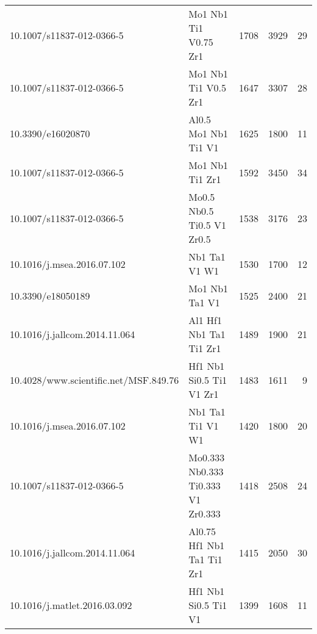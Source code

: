 \begin{tabular}{llrrr}
             10.1007/s11837-012-0366-5 &                        Mo1 Nb1 Ti1 V0.75 Zr1 &                1708 &                 3929 &                        29 \\
             10.1007/s11837-012-0366-5 &                         Mo1 Nb1 Ti1 V0.5 Zr1 &                1647 &                 3307 &                        28 \\
                     10.3390/e16020870 &                         Al0.5 Mo1 Nb1 Ti1 V1 &                1625 &                 1800 &                        11 \\
             10.1007/s11837-012-0366-5 &                              Mo1 Nb1 Ti1 Zr1 &                1592 &                 3450 &                        34 \\
             10.1007/s11837-012-0366-5 &                   Mo0.5 Nb0.5 Ti0.5 V1 Zr0.5 &                1538 &                 3176 &                        23 \\
            10.1016/j.msea.2016.07.102 &                                Nb1 Ta1 V1 W1 &                1530 &                 1700 &                        12 \\
                     10.3390/e18050189 &                               Mo1 Nb1 Ta1 V1 &                1525 &                 2400 &                        21 \\
         10.1016/j.jallcom.2014.11.064 &                      Al1 Hf1 Nb1 Ta1 Ti1 Zr1 &                1489 &                 1900 &                        21 \\
 10.4028/www.scientific.net/MSF.849.76 &                     Hf1 Nb1 Si0.5 Ti1 V1 Zr1 &                1483 &                 1611 &                         9 \\
            10.1016/j.msea.2016.07.102 &                            Nb1 Ta1 Ti1 V1 W1 &                1420 &                 1800 &                        20 \\
             10.1007/s11837-012-0366-5 &           Mo0.333 Nb0.333 Ti0.333 V1 Zr0.333 &                1418 &                 2508 &                        24 \\
         10.1016/j.jallcom.2014.11.064 &                   Al0.75 Hf1 Nb1 Ta1 Ti1 Zr1 &                1415 &                 2050 &                        30 \\
          10.1016/j.matlet.2016.03.092 &                         Hf1 Nb1 Si0.5 Ti1 V1 &                1399 &                 1608 &                        11 \\
\bottomrule
\end{tabular}
